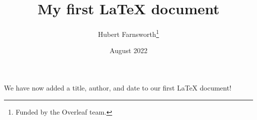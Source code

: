 \documentclass[12pt, letterpaper]{article}
\title{My first LaTeX document}
\author{Hubert Farnsworth\thanks{Funded by the Overleaf team.}}
\date{August 2022}
\begin{document}
\maketitle
We have now added a title, author, and date to our first \LaTeX{} document!
\end{document}
